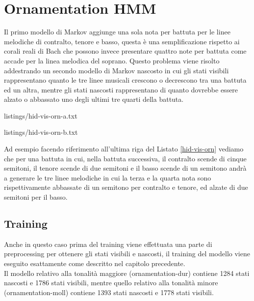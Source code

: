\chapter{Ornamentation HMM}\label{ch:hmm-ornamentation}
Il primo modello di Markov aggiunge una sola nota per battuta per le linee melodiche di contralto, tenore e basso, questa è una semplificazione rispetto ai corali reali di Bach che possono invece presentare quattro note per battuta come accade per la linea melodica del soprano. Questo problema viene risolto addestrando un secondo modello di Markov nascosto in cui gli stati visibili rappresentano quanto le tre linee musicali crescono o decrescono tra una battuta ed un altra, mentre gli stati nascosti rappresentano di quanto dovrebbe essere alzato o abbassato uno degli ultimi tre quarti della battuta.
\begin{center}
	\begin{minipage}[h]{.45\textwidth}
		
		{listings/hid-vis-orn-a.txt}
	\end{minipage}
	\hspace{.5cm}
	\begin{minipage}[h]{.45\textwidth}
		
		{listings/hid-vis-orn-b.txt}
	\end{minipage}
	\label{hid-vis-orn}
\end{center}
\noindent
Ad esempio facendo riferimento all'ultima riga del Listato \ref{hid-vis-orn} vediamo che per una battuta in cui, nella battuta successiva, il contralto scende di cinque semitoni, il tenore scende di due semitoni e il basso scende di un semitono andrà a generare le tre linee melodiche in cui la terza e la quarta nota sono rispettivamente abbassate di un semitono per contralto e tenore, ed alzate di due semitoni per il basso.
\section{Training}
Anche in questo caso prima del training viene effettuata una parte di preprocessing per ottenere gli stati visibili e nascosti, il training del modello viene eseguito esattamente come descritto nel capitolo precedente. \\
Il modello relativo alla tonalità maggiore (ornamentation-dur) contiene 1284 stati nascosti e 1786 stati visibili, mentre quello relativo alla tonalità minore (ornamentation-moll) contiene 1393 stati nascosti e 1778 stati visibili.
